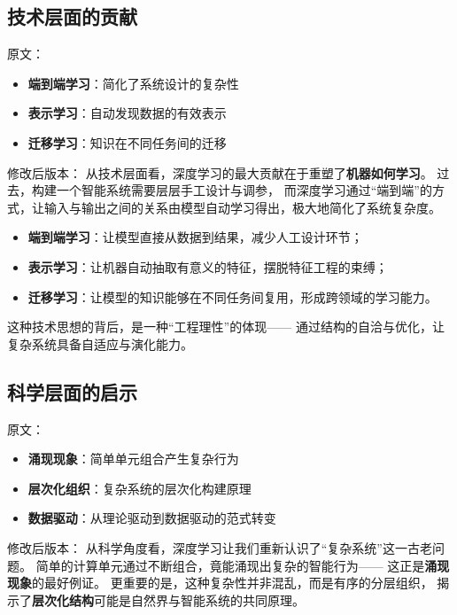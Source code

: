 \subsection{技术层面的贡献}

原文：
\begin{itemize}
\item \textbf{端到端学习}：简化了系统设计的复杂性
\item \textbf{表示学习}：自动发现数据的有效表示
\item \textbf{迁移学习}：知识在不同任务间的迁移
\end{itemize}
修改后版本：
从技术层面看，深度学习的最大贡献在于重塑了\textbf{机器如何学习}。  
过去，构建一个智能系统需要层层手工设计与调参，  
而深度学习通过“端到端”的方式，让输入与输出之间的关系由模型自动学习得出，极大地简化了系统复杂度。  

\begin{itemize}
\item \textbf{端到端学习}：让模型直接从数据到结果，减少人工设计环节；
\item \textbf{表示学习}：让机器自动抽取有意义的特征，摆脱特征工程的束缚；
\item \textbf{迁移学习}：让模型的知识能够在不同任务间复用，形成跨领域的学习能力。
\end{itemize}

这种技术思想的背后，是一种“工程理性”的体现——  
通过结构的自洽与优化，让复杂系统具备自适应与演化能力。



\subsection{科学层面的启示}

原文：
\begin{itemize}
\item \textbf{涌现现象}：简单单元组合产生复杂行为
\item \textbf{层次化组织}：复杂系统的层次化构建原理
\item \textbf{数据驱动}：从理论驱动到数据驱动的范式转变
\end{itemize}
修改后版本：
从科学角度看，深度学习让我们重新认识了“复杂系统”这一古老问题。  
简单的计算单元通过不断组合，竟能涌现出复杂的智能行为——  
这正是\textbf{涌现现象}的最好例证。  
更重要的是，这种复杂性并非混乱，而是有序的分层组织，  
揭示了\textbf{层次化结构}可能是自然界与智能系统的共同原理。  

